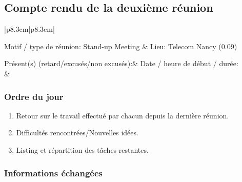 \documentclass[11pt]{article}
\begin{document}
\subsection{Compte rendu de la deuxième réunion}

\begin{center}

\begin{tabular}{|p{8.3cm}|p{8.3cm}|}
\hline

	 Motif / type de réunion: Stand-up Meeting &  
	 Lieu: Telecom Nancy (0.09)\\
	 
	\hline 
	
	Présent(s) (retard/excusés/non excusés):&
	Date / heure de début / durée:\\
	
	&
	\\
\hline

\end{tabular}

\end{center}

\subsubsection{Ordre du jour}

\begin{enumerate}

	\item 
		Retour sur le travail effectué par chacun depuis la dernière réunion.
\item 	Difficultés rencontrées/Nouvelles idées.
\item 	Listing et répartition des tâches restantes.

\end{enumerate}

\vspace{0.5cm}

\subsubsection{Informations échangées}
\vspace{0.2cm}
\end{document}
